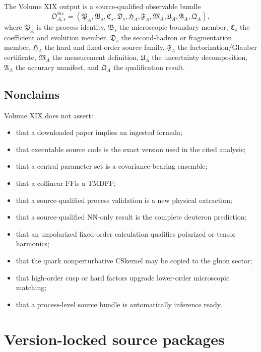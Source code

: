 \documentclass[11pt]{article}
\newcommand{\CS}{\ensuremath{\mathrm{CS}}}
\newcommand{\Src}{\ensuremath{\mathrm{Src}}}
\newcommand{\FF}{\ensuremath{\mathrm{FF}}}
\newcommand{\TMDFF}{\ensuremath{\mathrm{TMDFF}}}
\begin{document}
The Volume XIX output is a source-qualified observable bundle
\begin{equation}
 \mathfrak O_{A,s}^{\Src}
 =
 \left(
 \mathfrak P_A,
 \mathfrak B_s,
 \mathfrak C_s,
 \mathfrak D_s,
 \mathfrak H_A,
 \mathfrak F_A,
 \mathfrak M_A,
 \mathfrak U_A,
 \mathfrak A_A,
 \mathfrak Q_A
 \right),
 \label{eq:source-observable-bundle}
\end{equation}
where \(\mathfrak P_A\) is the process identity, \(\mathfrak B_s\) the microscopic boundary member, \(\mathfrak C_s\) the coefficient and evolution member, \(\mathfrak D_s\) the second-hadron or fragmentation member, \(\mathfrak H_A\) the hard and fixed-order source family, \(\mathfrak F_A\) the factorization/Glauber certificate, \(\mathfrak M_A\) the measurement definition, \(\mathfrak U_A\) the uncertainty decomposition, \(\mathfrak A_A\) the accuracy manifest, and \(\mathfrak Q_A\) the qualification result.

\subsection{Nonclaims}

Volume XIX does not assert:
\begin{itemize}
\item that a downloaded paper implies an ingested formula;
\item that executable source code is the exact version used in the cited analysis;
\item that a central parameter set is a covariance-bearing ensemble;
\item that a collinear \FF is a \TMDFF;
\item that a source-qualified process validation is a new physical extraction;
\item that a source-qualified NN-only result is the complete deuteron prediction;
\item that an unpolarized fixed-order calculation qualifies polarized or tensor harmonics;
\item that the quark nonperturbative \CS kernel may be copied to the gluon sector;
\item that high-order cusp or hard factors upgrade lower-order microscopic matching;
\item that a process-level source bundle is automatically inference ready.
\end{itemize}

\section{Version-locked source packages}
\label{sec:source-packages}
\end{document}
